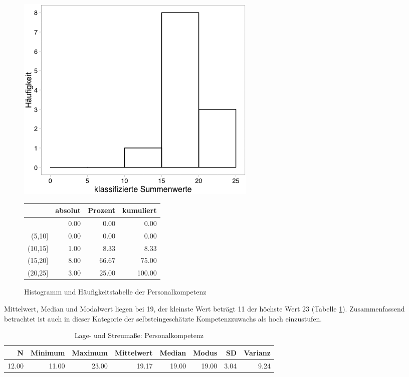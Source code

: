 \documentclass[12pt,smallheadings, bibliography=totoc]{scrartcl}
\begin{document}
\begin{figure}[H]
\begin{minipage}{.4\linewidth}
\includegraphics[width=0.8\linewidth]{Anhang/PKHistnn.png}

\end{minipage}
\begin{minipage}{.4\linewidth}
\centering
\raisebox{\depth}
{\begin{tabular}{rrrr}
  \hline
 & absolut & Prozent & kumuliert \\
  \hline
[5] & 0.00 & 0.00 & 0.00 \\
  (5,10] & 0.00 & 0.00 & 0.00 \\
  (10,15] & 1.00 & 8.33 & 8.33 \\
  (15,20] & 8.00 & 66.67 & 75.00 \\
  (20,25] & 3.00 & 25.00 & 100.00 \\
   \hline
\end{tabular}

}
\label{tab:defis}
\end{minipage}
\caption{Histogramm und Häufigkeitstabelle der Personalkompetenz}
\label{fig:PK}
\end{figure}

Mittelwert, Median und Modalwert liegen bei 19, der kleinste Wert
beträgt 11 der höchste Wert 23 (Tabelle \ref{tab:lPK}). Zusammenfassend
betrachtet ist auch in dieser Kategorie der selbsteingeschätzte
Kompetenzzuwachs als hoch einzustufen.

\begin{table}[H]
\centering
\caption{Lage- und Streumaße: Personalkompetenz}
\label{tab:lPK}
\begin{tabular}{rrrrrrrr}
  \hline
  N & Minimum & Maximum & Mittelwert & Median & Modus & SD & Varianz \\
  \hline
  12.00 & 11.00 & 23.00 & 19.17 & 19.00 & 19.00 & 3.04 & 9.24 \\
   \hline
\end{tabular}
\end{table}
\end{document}
